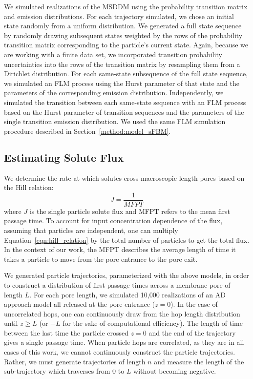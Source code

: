 \documentclass[journal=ancac3,manuscript=article,layout=twocolumn]{achemso}
\begin{document}
  We simulated realizations of the MSDDM using the probability transition
  matrix and emission distributions. For each trajectory simulated, we chose an
  initial state randomly from a uniform distribution. We generated a full state
  sequence by randomly drawing subsequent states weighted by the rows of the
  probability transition matrix corresponding to the particle's current state.
  Again, because we are working with a finite data set, we incorporated
  transition probability uncertainties into the rows of the transition matrix
  by resampling them from a Dirichlet distribution. For each same-state
  subsequence of the full state sequence, we simulated an FLM process using the
  Hurst parameter of that state and the parameters of the corresponding
  emission distribution. Independently, we simulated the transition between
  each same-state sequence with an FLM process based on the Hurst parameter of
  transition sequences and the parameters of the single transition emission
  distribution. We used the same FLM simulation procedure described in
  Section~\ref{method:model_sFBM}.

  \subsection{Estimating Solute Flux}\label{method:mfpt}
  
  We determine the rate at which solutes cross macroscopic-length pores based
  on the Hill relation:~\cite{hill_free_1989}
  \begin{equation}
  J = \frac{1}{MFPT}
  \label{eqn:hill_relation}
  \end{equation}
  where $J$ is the single particle solute flux and MFPT refers to the mean
  first passage time. To account for input concentration dependence of the
  flux, assuming that particles are independent, one can multiply
  Equation~\ref{eqn:hill_relation} by the total number of particles to get the
  total flux. In the context of our work, the MFPT describes the average length
  of time it takes a particle to move from the pore entrance to the pore exit. 
  
  We generated particle trajectories, parameterized with the above models, in
  order to construct a distribution of first passage times across a membrane
  pore of length $L$. For each pore length, we simulated 10,000 realizations
  of an AD approach model
  all released at the pore entrance ($z=0$).  In the case of uncorrelated hops,
  one can continuously draw from the hop length distribution until $z \geq L$
  (or $-L$ for the sake of computational efficiency). The length of time
  between the last time the particle crossed $z=0$ and the end of the
  trajectory gives a single passage time. When particle hops are correlated, as
  they are in all cases of this work, we cannot continuously construct the
  particle trajectories. Rather, we must generate trajectories of length $n$
  and measure the length of the sub-trajectory which traverses from $0$ to $L$
  without becoming negative.
  
\end{document}
